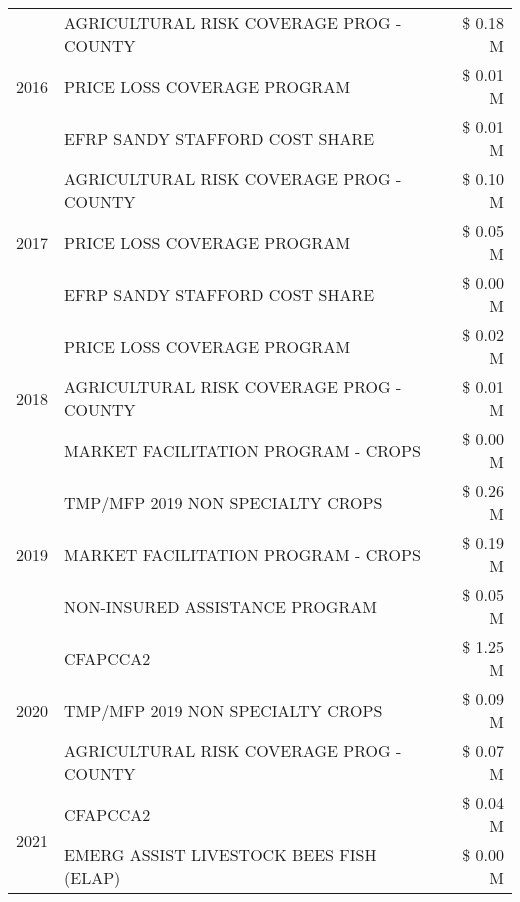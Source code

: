 \begin{tabular}{llr}
\cline{1-3}
\multirow[t]{3}{*}{2016} & AGRICULTURAL RISK COVERAGE PROG - COUNTY & \$ 0.18 M \\
 & PRICE LOSS COVERAGE PROGRAM & \$ 0.01 M \\
 & EFRP SANDY STAFFORD COST SHARE & \$ 0.01 M \\
\cline{1-3}
\multirow[t]{3}{*}{2017} & AGRICULTURAL RISK COVERAGE PROG - COUNTY & \$ 0.10 M \\
 & PRICE LOSS COVERAGE PROGRAM & \$ 0.05 M \\
 & EFRP SANDY STAFFORD COST SHARE & \$ 0.00 M \\
\cline{1-3}
\multirow[t]{3}{*}{2018} & PRICE LOSS COVERAGE PROGRAM & \$ 0.02 M \\
 & AGRICULTURAL RISK COVERAGE PROG - COUNTY & \$ 0.01 M \\
 & MARKET FACILITATION PROGRAM - CROPS & \$ 0.00 M \\
\cline{1-3}
\multirow[t]{3}{*}{2019} & TMP/MFP 2019 NON SPECIALTY CROPS & \$ 0.26 M \\
 & MARKET FACILITATION PROGRAM - CROPS & \$ 0.19 M \\
 & NON-INSURED ASSISTANCE PROGRAM & \$ 0.05 M \\
\cline{1-3}
\multirow[t]{3}{*}{2020} & CFAPCCA2 & \$ 1.25 M \\
 & TMP/MFP 2019 NON SPECIALTY CROPS & \$ 0.09 M \\
 & AGRICULTURAL RISK COVERAGE PROG - COUNTY & \$ 0.07 M \\
\cline{1-3}
\multirow[t]{2}{*}{2021} & CFAPCCA2 & \$ 0.04 M \\
 & EMERG ASSIST LIVESTOCK BEES FISH (ELAP) & \$ 0.00 M \\
\cline{1-3}
\bottomrule
\end{tabular}
